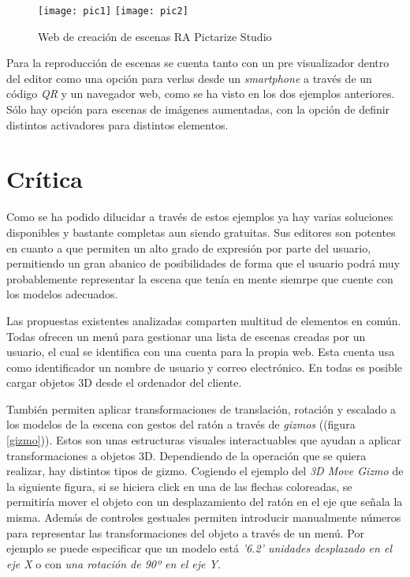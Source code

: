\begin{figure}[h]
    \centering
    \texttt{[image: pic1]}
    \texttt{[image: pic2]}
    \caption[Aplicación Pictarize Studio]{Web de creación de escenas RA Pictarize Studio}
    \label{fig:pictarize}
\end{figure}

Para la reproducción de escenas se cuenta tanto con un pre visualizador dentro del editor como una opción para verlas desde un \textit{smartphone} a través de un código \textit{QR} y un navegador web, como se ha visto en los dos ejemplos anteriores. Sólo hay opción para escenas de imágenes aumentadas, con la opción de definir distintos activadores para distintos elementos.

\section{Crítica}

Como se ha podido dilucidar a través de estos ejemplos ya hay varias soluciones disponibles y bastante completas aun siendo gratuitas. Sus editores son potentes en cuanto a que permiten un alto grado de expresión por parte del usuario, permitiendo un gran abanico de posibilidades de forma que el usuario podrá muy probablemente representar la escena que tenía en mente siemrpe que cuente con los modelos adecuados.

Las propuestas existentes analizadas comparten multitud de elementos en común. Todas ofrecen un menú para gestionar una lista de escenas creadas por un usuario, el cual se identifica con una cuenta para la propia web. Esta cuenta usa como identificador un nombre de usuario y correo electrónico. En todas es posible cargar objetos 3D desde el ordenador del cliente.

También permiten aplicar transformaciones de translación, rotación y escalado a los modelos de la escena con gestos del ratón a través de \textit{gizmos} ((figura \ref{gizmo})). Estos son unas estructuras visuales interactuables que ayudan a aplicar transformaciones a objetos 3D. Dependiendo de la operación que se quiera realizar, hay distintos tipos de gizmo. Cogiendo el ejemplo del \textit{3D Move Gizmo} de la siguiente figura, si se hiciera click en una de las flechas coloreadas, se permitiría mover el objeto con un desplazamiento del ratón en el eje que señala la misma. Además de controles gestuales permiten introducir manualmente números para representar las transformaciones del objeto a través de un menú. Por ejemplo se puede especificar que un modelo está \textit{'6.2' unidades desplazado en el eje X} o con \textit{una rotación de 90º en el eje Y}.

